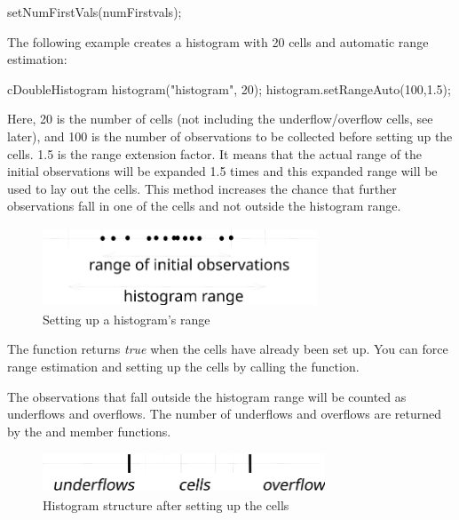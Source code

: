 \begin{cpp}
setNumFirstVals(numFirstvals);
\end{cpp}

The following example creates a histogram with 20 cells and automatic
range estimation:

\begin{cpp}
cDoubleHistogram histogram("histogram", 20);
histogram.setRangeAuto(100,1.5);
\end{cpp}


Here, 20 is the number of cells (not including the underflow/overflow
cells, see later), and 100 is the number of observations to be
collected before setting up the cells. 1.5 is the range extension
factor. It means that the actual range of the initial observations
will be expanded 1.5 times and this expanded range will be used to lay
out the cells. This method increases the chance that further
observations fall in one of the cells and not outside the histogram
range.

\begin{figure}[htbp]
  \begin{center}
    \includegraphics[width=3.215in, height=0.930in]{figures/simlib-histogramrange}
    \caption{Setting up a histogram's range}
  \end{center}
\end{figure}

The  function returns \textit{true} when the cells have
already been set up. You can force range estimation and setting
up the cells by calling the  function.

The observations that fall outside the histogram range will be counted
as underflows and overflows. The number of underflows and overflows
are returned by the  and 
member functions.

\begin{figure}[htbp]
\begin{center}
  \includegraphics[width=3.310in, height=0.467in]{figures/simlib-histogramsetup}
  \caption{Histogram structure after setting up the cells}
\end{center}
\end{figure}

